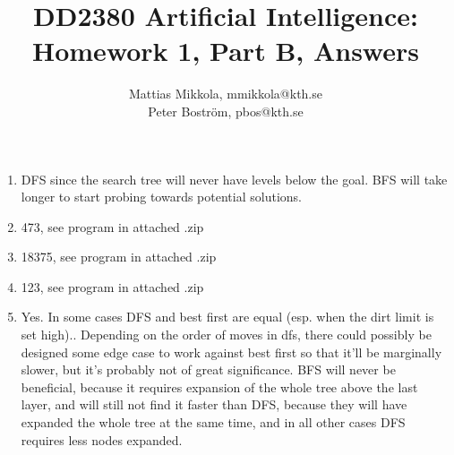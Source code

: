 \documentclass[a4paper] {article}
\title {DD2380 Artificial Intelligence:\\
	Homework 1, Part B, Answers}
\author {Mattias Mikkola, mmikkola@kth.se\\
	Peter Boström, pbos@kth.se}
\begin{document}
\maketitle
\begin {enumerate}
\item DFS since the search tree will never have levels below the goal. BFS will take longer to start probing towards potential solutions.

\item 473, see program in attached .zip

\item 18375, see program in attached .zip

\item 123, see program in attached .zip

\item Yes. In some cases DFS and best first are equal (esp. when the dirt limit is set high).. Depending on the order of moves in dfs, there could possibly be designed some edge case to work against best first so that it'll be marginally slower, but it's probably not of great significance. BFS will never be beneficial, because it requires expansion of the whole tree above the last layer, and will still not find it faster than DFS, because they will have expanded the whole tree at the same time, and in all other cases DFS requires less nodes expanded.

\end{enumerate}
\end{document}
